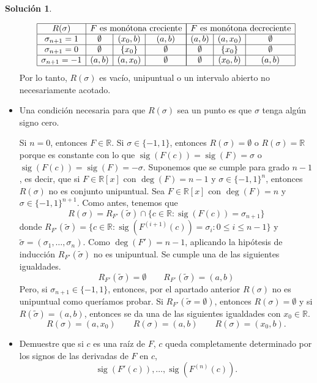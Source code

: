 \documentclass[10pt]{article}
\theoremstyle{definition}
\newtheorem*{sol}{Solución}
\newcommand{\RR}{\mathbb{R}}
\newcommand{\RRx}{\mathbb{R}[x]}
\newcommand{\sig}{\operatorname{sig}}
\begin{document}
\begin{sol}
\begin{itemize}
    \[\begin{array}{|c|c|c|c|}
        \hline R(\sigma)& \multicolumn{3}{c|}{\text{$F$ es monótona creciente}}\\
        \hline \sigma_{n+1}=1 & \emptyset & (x_0,b) & (a,b) \\
        \hline \sigma_{n+1}=0 & \emptyset & \{x_0\} & \emptyset \\
        \hline \sigma_{n+1}=-1 & (a,b) & (a,x_0) & \emptyset \\ \hline
    \end{array}
    \begin{array}{|c|c|c|}
        \hline \multicolumn{3}{|c|}{\text{$F$ es monótona decreciente}}\\
        \hline (a,b) & (a,x_0) & \emptyset \\
        \hline \emptyset & \{x_0\} & \emptyset \\
        \hline \emptyset & (x_0,b) & (a,b) \\ \hline
    \end{array}
    \]
    Por lo tanto, $R(\sigma)$ es vacío, unipuntual o un intervalo abierto no necesariamente acotado.
    \item Una condición necesaria para que $R(\sigma)$ sea un punto es que $\sigma$ tenga algún signo cero.
    
    Si $n=0$, entonces $F\in\RR$. Si $\sigma\in\{-1,1\}$, entonces $R(\sigma)=\emptyset$ o $R(\sigma)=\RR$ porque es constante con lo que $\sig(F(c))=\sig(F)=\sigma$ o $\sig(F(c))=\sig(F)=-\sigma$. Suponemos que se cumple para grado $n-1$, es decir, que si $F\in\RRx$ con $\deg(F)=n-1$ y $\sigma\in\{-1,1\}^{n}$, entonces $R(\sigma)$ no es conjunto unipuntual. Sea $F\in\RRx$ con $\deg(F)=n$ y $\sigma\in\{-1,1\}^{n+1}$. Como antes, tenemos que
    \[R(\sigma)=R_{F'}(\tilde{\sigma})\cap\{c\in\RR : \sig(F(c))=\sigma_{n+1}\}\]
    donde $R_{F'}(\tilde{\sigma})=\{c\in\RR : \sig(F^{(i+1)}(c))=\sigma_i : 0\leq i\leq n-1\}$ y $\tilde{\sigma}=(\sigma_1,\ldots,\sigma_n)$. Como $\deg(F')=n-1$, aplicando la hipótesis de inducción $R_{F'}(\tilde{\sigma})$ no es unipuntual. Se cumple una de las siguientes igualdades.
    \[R_{F'}(\tilde{\sigma})=\emptyset\qquad R_{F'}(\tilde{\sigma})=(a,b)\]
    Pero, si $\sigma_{n+1}\in\{-1,1\}$, entonces, por el apartado anterior $R(\sigma)$ no es unipuntual como queríamos probar. Si $R_{F'}(\tilde{\sigma}=\emptyset)$, entonces $R(\sigma)=\emptyset$ y si $R(\tilde{\sigma})=(a,b)$, entonces se da una de las siguientes igualdades con $x_0\in\RR$.
    \[R(\sigma)=(a,x_0)\qquad R(\sigma)=(a,b)\qquad R(\sigma)=(x_0,b).\]
    \item Demuestre que si $c$ es una raíz de $F$, $c$ queda completamente determinado por los signos de las derivadas de $F$ en $c$,
    \[\sig(F'(c)),\ldots,\sig(F^{(n)}(c)).\]
    

\end{itemize}
\end{sol}
\end{document}

